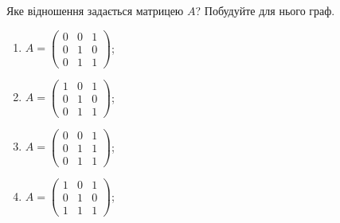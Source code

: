 \begin{problem}
	Яке відношення задається матрицею $A$? Побудуйте для нього граф.
	\begin{multicols}{2}
		\begin{enumerate}
			\item $A = \begin{pmatrix} 0 & 0 & 1 \\ 0 & 1 & 0 \\ 0 & 1 & 1 \end{pmatrix}$;
			\item $A = \begin{pmatrix} 1 & 0 & 1 \\ 0 & 1 & 0 \\ 0 & 1 & 1 \end{pmatrix}$;
			\item $A = \begin{pmatrix} 0 & 0 & 1 \\ 0 & 1 & 1 \\ 0 & 1 & 1 \end{pmatrix}$;
			\item $A = \begin{pmatrix} 1 & 0 & 1 \\ 0 & 1 & 0 \\ 1 & 1 & 1 \end{pmatrix}$;
		\end{enumerate}
	\end{multicols}
\end{problem}

